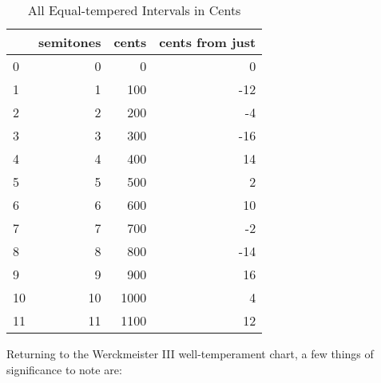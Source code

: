 \begin{singlespace}
\begin{table}[H]
\centering
\small
\begin{tabular}{|lrrr|}
\hline
\textbf{{}} & \textbf{ semitones} & \textbf{ cents} & \textbf{ cents from just }\\
\hline
0  &          0 &      0 &                0 \\
1  &          1 &    100 &              -12 \\
2  &          2 &    200 &               -4 \\
3  &          3 &    300 &              -16 \\
4  &          4 &    400 &               14 \\
5  &          5 &    500 &                2 \\
6  &          6 &    600 &               10 \\
7  &          7 &    700 &               -2 \\
8  &          8 &    800 &              -14 \\
9  &          9 &    900 &               16 \\
10 &         10 &   1000 &                4 \\
11 &         11 &   1100 &               12 \\
\hline
\end{tabular}
\caption{All Equal-tempered Intervals in Cents }
\end{table}
\normalsize
\end{singlespace}
    Returning to the Werckmeister III well-temperament chart, a few things
of significance to note are:

